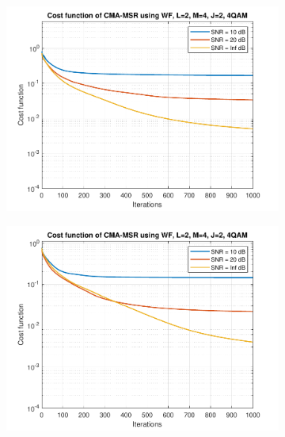 \begin{figure}
	\centering
	\begin{subfigure}[b]{0.45\textwidth}
		\includegraphics[width=\linewidth]{./figs/BF_WF_MSR_cost_4QAM_L=2_M=4_J=2_K=200.pdf}
		\label{fig:wf_msr_cost200}
	\end{subfigure}
	\begin{subfigure}[b]{0.45\textwidth}
		\includegraphics[width=\linewidth]{./figs/BF_WF_MSR_cost_4QAM_L=2_M=4_J=2_K=1000.pdf}
		\label{fig:wf_msr_cost1000}
	\end{subfigure}\\
	\begin{subfigure}[b]{0.45\textwidth}

\end{subfigure}
\end{figure}
